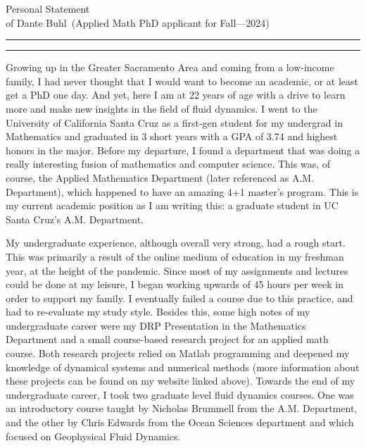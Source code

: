 \documentclass{article}
\newcommand{\soptitle}{Personal Statement}
\newcommand{\yourname}{Dante Buhl}
\begin{document}
\begin{center}\LARGE\soptitle\\
\large of \yourname\ (Applied Math PhD applicant for Fall---2024)
\end{center}

\hrule
\vspace{1pt}
\hrule height 1pt

\bigskip

\large
Growing up in the Greater Sacramento Area and coming from a low-income family, I had never thought that I would want to become an academic, or at least get a PhD one day. And yet, here I am at 22 years of age with a drive to learn more and make new insights in the field of fluid dynamics. I went to the University of California Santa Cruz as a first-gen student for my undergrad in Mathematics and graduated in 3 short years with a GPA of 3.74 and highest honors in the major. Before my departure, I found a department that was doing a really interesting fusion of mathematics and computer science. This was, of course, the Applied Mathematics Department (later referenced as A.M. Department), which happened to have an amazing 4+1 master's program. This is my current academic position as I am writing this: a graduate student in UC Santa Cruz's A.M. Department. 

My undergraduate experience, although overall very strong, had a rough start. This was primarily a result of the online medium of education in my freshman year, at the height of the pandemic. Since most of my assignments and lectures could be done at my leisure, I began working upwards of 45 hours per week in order to support my family. I eventually failed a course due to this practice, and had to re-evaluate my study style. Besides this, some high notes of my undergraduate career were my DRP Presentation in the Mathematics Department and a small course-based research project for an applied math course. Both research projects relied on Matlab programming and deepened my knowledge of dynamical systems and numerical methods (more information about these projects can be found on my website linked above). Towards the end of my undergraduate career, I took two graduate level fluid dynamics courses. One was  an introductory course taught by Nicholas Brummell from the A.M. Department, and the other by Chris Edwards from the Ocean Sciences department and which focused on Geophysical Fluid Dynamics. 
\end{document}
